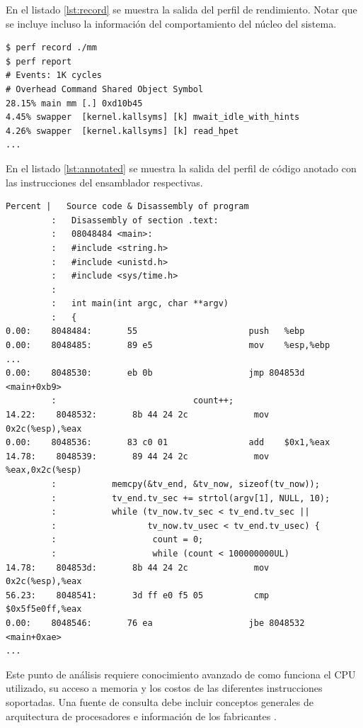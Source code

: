\documentclass[a4paper]{report}
\begin{document}
En el listado \ref{lst:record} se muestra la salida del perfil de rendimiento. Notar que se incluye incluso la información del comportamiento del núcleo del sistema.

\begin{lstlisting}[caption={Perfil de Rendimiento},label={lst:record}]
$ perf record ./mm
$ perf report
# Events: 1K cycles
# Overhead Command Shared Object Symbol
28.15% main mm [.] 0xd10b45
4.45% swapper  [kernel.kallsyms] [k] mwait_idle_with_hints
4.26% swapper  [kernel.kallsyms] [k] read_hpet
...
\end{lstlisting}

En el listado \ref{lst:annotated} se muestra la salida del perfil de código anotado con las instrucciones del ensamblador respectivas.

\begin{lstlisting}[caption={Código Anotado},label={lst:annotated}]
 Percent |   Source code & Disassembly of program
         :   Disassembly of section .text:
         :   08048484 <main>:
         :   #include <string.h>
         :   #include <unistd.h>
         :   #include <sys/time.h>
         :
         :   int main(int argc, char **argv)
         :   {
0.00:    8048484:       55                      push   %ebp
0.00:    8048485:       89 e5                   mov    %esp,%ebp
...
0.00:    8048530:       eb 0b                   jmp 804853d <main+0xb9>
         :                           count++;
14.22:    8048532:       8b 44 24 2c             mov    0x2c(%esp),%eax
0.00:    8048536:       83 c0 01                add    $0x1,%eax
14.78:    8048539:       89 44 24 2c             mov    %eax,0x2c(%esp)
         :           memcpy(&tv_end, &tv_now, sizeof(tv_now));
         :           tv_end.tv_sec += strtol(argv[1], NULL, 10);
         :           while (tv_now.tv_sec < tv_end.tv_sec ||
         :                  tv_now.tv_usec < tv_end.tv_usec) {
         :                   count = 0;
         :                   while (count < 100000000UL)
14.78:    804853d:       8b 44 24 2c             mov    0x2c(%esp),%eax
56.23:    8048541:       3d ff e0 f5 05          cmp    $0x5f5e0ff,%eax
0.00:    8048546:       76 ea                   jbe 8048532 <main+0xae>
...
\end{lstlisting}

Este punto de análisis requiere conocimiento avanzado de como funciona el CPU utilizado, su acceso a memoria y los costos de las diferentes instrucciones soportadas. Una fuente de consulta debe incluir conceptos generales de arquitectura de procesadores \cite{hennessy} e información de los fabricantes \cite{intel-optimization}.
\end{document}
